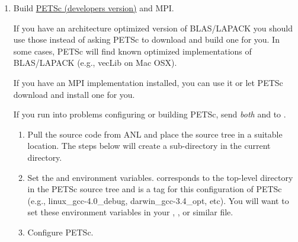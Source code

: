 \begin{enumerate}
\item Build
  \href{http://www-unix.mcs.anl.gov/petsc/petsc-as/developers/index.html}{PETSc
    (developers version)} and MPI.
  
  If you have an architecture optimized version of BLAS/LAPACK you
  should use those instead of asking PETSc to download and build one
  for you. In some cases, PETSc will find known optimized
  implementations of BLAS/LAPACK (e.g., vecLib on Mac OSX).
  
  If you have an MPI implementation installed, you can use it or let
  PETSc download and install one for you.

  \begin{tip}
    If you run into problems configuring or building PETSc, send {\em
      both}  and
     to
    .
  \end{tip}

  \begin{enumerate}
  \item Pull the source code from ANL and place the source tree in a
    suitable location. The steps below will create a
     sub-directory in the current directory.

    \begin{screen}
      \shellprompt{}
      \shellprompt{}
      \shellprompt{}
    \end{screen}
    
  \item Set the  and  environment
    variables.  corresponds to the top-level
    directory in the PETSc source tree and  is a tag
    for this configuration of PETSc (e.g., linux\_gcc-4.0\_debug,
    darwin\_gcc-3.4\_opt, etc). You will want to set these environment
    variables in your , , or
    similar file.

    \begin{screen}
      \shellprompt{}
      \shellprompt{}
    \end{screen}
  \item Configure PETSc.
    

\end{enumerate}
\end{enumerate}
